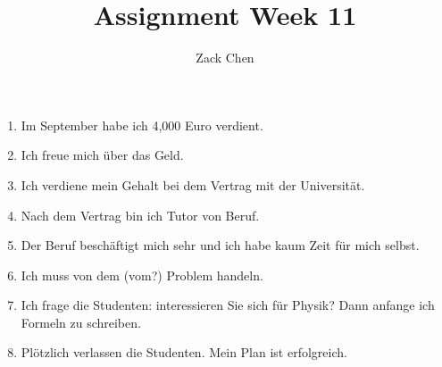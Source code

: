 \documentclass{article}
\title{Assignment Week 11}
\author{Zack Chen}
\begin{document}
\maketitle

\begin{enumerate}
    \item Im September habe ich 4,000 Euro verdient.
    \item Ich freue mich \"uber das Geld.
    \item Ich verdiene mein Gehalt bei dem Vertrag mit der Universit\"at.
    \item Nach dem Vertrag bin ich Tutor von Beruf.
    \item Der Beruf besch\"aftigt mich sehr und ich habe kaum Zeit f\"ur mich selbst.
    \item Ich muss von dem (vom?) Problem handeln.
    \item Ich frage die Studenten: interessieren Sie sich f\"ur Physik?
    Dann anfange ich Formeln zu schreiben.
    \item Pl\"otzlich verlassen die Studenten.
    Mein Plan ist erfolgreich.
\end{enumerate}


% 
% 
\end{document}

